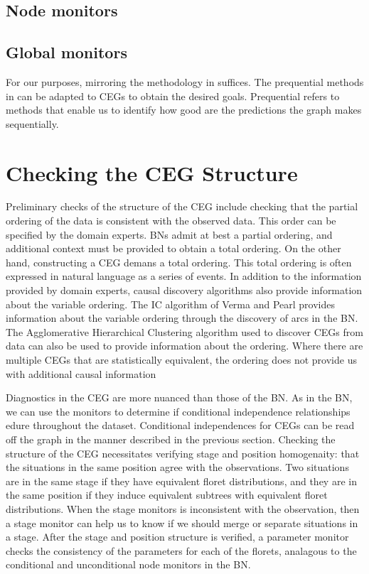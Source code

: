 \documentclass[12pt]{article}
\begin{document}
\subsection{Node monitors}

\subsection{Global monitors}


For our purposes, mirroring the methodology in \cite{diagnostics} suffices. The prequential methods in \cite{diagnostics} can be adapted to CEGs to obtain the desired goals. Prequential refers to methods that enable us to identify how good are the predictions the graph makes sequentially. 

\section{Checking the CEG Structure}

Preliminary checks of the structure of the CEG include checking that the partial ordering of the data is consistent with the observed data. This order can be specified by the domain experts. BNs admit at best a partial ordering, and additional context must be provided to obtain a total ordering. On the other hand, constructing a CEG demans a total ordering. This total ordering is often expressed in natural language as a series of events. 
In addition to the information provided by domain experts, causal discovery algorithms also provide information about the variable ordering. The IC algorithm of Verma and Pearl provides information about the variable ordering through the discovery of arcs in the BN. The Agglomerative Hierarchical Clustering algorithm used to discover CEGs from data can also be used to provide information about the ordering. Where there are multiple CEGs that are statistically equivalent, the ordering does not provide us with additional causal information %

Diagnostics in the CEG are more nuanced than those of the BN. As in the BN, we can use the monitors to determine if conditional independence relationships edure throughout the dataset. Conditional independences for CEGs can be read off the graph in the manner described in the previous section. %
Checking the structure of the CEG necessitates verifying stage and position homogenaity: that the situations in the same position agree with the observations. Two situations are in the same stage if they have equivalent floret distributions, and they are in the same position if they induce equivalent subtrees with equivalent floret distributions. 
When the stage monitors is inconsistent with the observation, then a stage monitor can help us to know if we should merge or separate situations in a stage. 
After the stage and position structure is verified, a parameter monitor checks the consistency of the parameters for each of the florets, analagous to the conditional and unconditional node monitors in the BN. 
 
\end{document}
